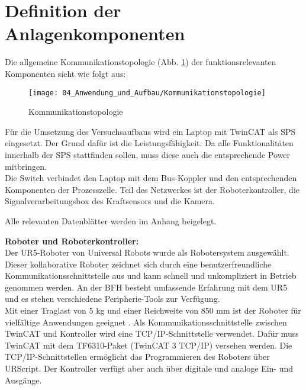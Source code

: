 \section{Definition der Anlagenkomponenten} \label{Anlagenkomponenten}
	Die allgemeine Kommunikationstopologie (Abb. \ref{fig:Kommunikationstopologie}) der funktionsrelevanten Komponenten sieht wie folgt aus: 
	
	\begin{figure}[h!]
		\centering
		\texttt{[image: 04\_Anwendung\_und\_Aufbau/Kommunikationstopologie]}
		\captionsetup{justification=centering}
		\caption{Kommunikationstopologie}
		\label{fig:Kommunikationstopologie}
	\end{figure}
	
	Für die Umsetzung des Versuchsaufbaus wird ein Laptop mit TwinCAT als SPS eingesetzt. Der Grund dafür ist die Leistungsfähigkeit. Da alle Funktionalitäten innerhalb der \Gls{SPS} stattfinden sollen, muss diese auch die entsprechende Power mitbringen. 
	\\
	Die Switch verbindet den Laptop mit dem Bus-Koppler und den entsprechenden Komponenten der Prozesszelle. Teil des Netzwerkes ist der Roboterkontroller, die Signalverarbeitungsbox des Kraftsensors und die Kamera. 
	
	\begin{bfhNoteBox}
		Alle relevanten Datenblätter werden im Anhang beigelegt.
	\end{bfhNoteBox}
	\vspace{3mm}  
	
	\textbf{Roboter und Roboterkontroller:}
	\vspace{2mm} 
	\\
	Der UR5-Roboter von Universal Robots wurde als Robotersystem ausgewählt. Dieser kollaborative Roboter zeichnet sich durch eine benutzerfreundliche Kommunikationsschnittstelle aus und kann schnell und unkompliziert in Betrieb genommen werden. An der BFH besteht umfassende Erfahrung mit dem UR5 und es stehen verschiedene Peripherie-Tools zur Verfügung.
	\\
	Mit einer Traglast von 5 kg und einer Reichweite von 850 mm ist der Roboter für vielfältige Anwendungen geeignet \cite{UR5}. Als Kommunikationsschnittstelle zwischen TwinCAT und Kontroller wird eine TCP/IP-Schnittstelle verwendet. Dafür muss TwinCAT mit dem TF6310-Paket (TwinCAT 3 TCP/IP) versehen werden. Die TCP/IP-Schnittstellen ermöglicht das Programmieren des Roboters über URScript. Der Kontroller verfügt aber auch über digitale und analoge Ein- und Ausgänge. 
	
